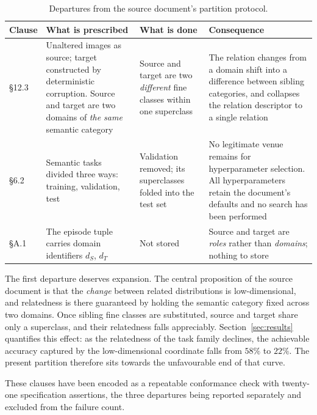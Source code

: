 \documentclass[11pt]{article}
\begin{document}
\begin{table}[htbp]
\centering\small
\begin{tabular}{@{}p{1.6cm}p{4.2cm}p{3.0cm}p{5.2cm}@{}}
\toprule
\textbf{Clause} & \textbf{What is prescribed} & \textbf{What is done} & \textbf{Consequence} \\
\midrule
\S12.3 & Unaltered images as source; target constructed by deterministic corruption. Source and
         target are two domains of \emph{the same} semantic category
       & Source and target are two \emph{different} fine classes within one superclass
       & The relation changes from a domain shift into a difference between sibling categories, and
         collapses the relation descriptor to a single relation \\[3pt]
\S6.2  & Semantic tasks divided three ways: training, validation, test
       & Validation removed; its superclasses folded into the test set
       & No legitimate venue remains for hyperparameter selection. All hyperparameters retain the
         document's defaults and no search has been performed \\[3pt]
\S A.1 & The episode tuple carries domain identifiers $d_S$, $d_T$
       & Not stored
       & Source and target are \emph{roles} rather than \emph{domains}; nothing to store \\
\bottomrule
\end{tabular}
\caption{Departures from the source document's partition protocol.}
\label{tab:departures}
\end{table}

The first departure deserves expansion. The central proposition of the source document is that the
\emph{change} between related distributions is low-dimensional, and relatedness is there guaranteed
by holding the semantic category fixed across two domains. Once sibling fine classes are
substituted, source and target share only a superclass, and their relatedness falls appreciably.
Section~\ref{sec:results} quantifies this effect: as the relatedness of the task family declines,
the achievable accuracy captured by the low-dimensional coordinate falls from $58\%$ to $22\%$. The
present partition therefore sits towards the unfavourable end of that curve.

These clauses have been encoded as a repeatable conformance check with twenty-one specification
assertions, the three departures being reported separately and excluded from the failure count.

\end{document}
